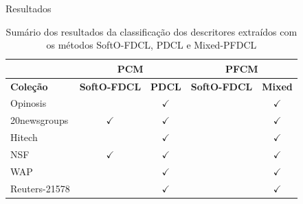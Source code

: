 \documentclass[brazil]{beamer}
\begin{document}
\begin{frame}{Resultados}
  \begin{table}[!htp]
    \centering
    \begin{tabular}{|l|c c|c c|}
      \hline
      & \multicolumn{2}{c|}{PCM} & \multicolumn{2}{c|}{PFCM} \\
      \hline
      {\bf Coleção} & {\bf SoftO-FDCL} & {\bf PDCL} & {\bf SoftO-FDCL} & {\bf Mixed} \\
      \hline
      Opinosis & & $\checkmark$ & & $\checkmark$ \\
      \hline
      20newsgroups & $\checkmark$ & $\checkmark$ & & $\checkmark$\\
      \hline
      Hitech & & $\checkmark$ & & $\checkmark$ \\
      \hline
      NSF &  $\checkmark$ & $\checkmark$ & & $\checkmark$\\
      \hline
      WAP & & $\checkmark$ & & $\checkmark$\\
      \hline
      Reuters-21578 & & $\checkmark$ & & $\checkmark$\\
      \hline
    \end{tabular}
    \caption{Sumário dos resultados da classificação dos descritores extraídos com os métodos
    SoftO-FDCL, PDCL e Mixed-PFDCL}
    \label{table:pdclsummary}
  \end{table}
\end{frame}
\end{document}
